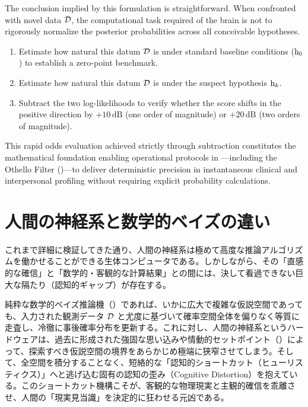     The conclusion implied by this formulation is straightforward.
    When confronted with novel data $\mathcal{D}$, the computational task required of the brain is not to rigorously normalize the posterior probabilities across all conceivable hypotheses.
    \begin{enumerate}
        \item Estimate how natural this datum $\mathcal{D}$ is under standard baseline conditions ($\mathrm{h}_0$) to establish a zero-point benchmark.
        \item Estimate how natural this datum $\mathcal{D}$ is under the suspect hypothesis $\mathrm{h}_k$.
        \item Subtract the two log-likelihoods to verify whether the score shifts in the positive direction by $+10\,\text{dB}$ (one order of magnitude) or $+20\,\text{dB}$ (two orders of magnitude).
    \end{enumerate}

    This rapid odds evaluation achieved strictly through subtraction constitutes the mathematical foundation enabling operational protocols in \fullSNLP—including the Othello Filter (\fullOthelloFilter)—to deliver deterministic precision in instantaneous clinical and interpersonal profiling without requiring explicit probability calculations.
\fi


\ifja
    \section{人間の神経系と数学的ベイズの違い}

    これまで詳細に検証してきた通り、人間の神経系は極めて高度な推論アルゴリズムを働かせることができる生体コンピュータである。しかしながら、その「直感的な確信」と「数学的・客観的な計算結果」との間には、決して看過できない巨大な隔たり（認知的ギャップ）が存在する。

    純粋な数学的ベイズ推論機（\fullMBIE）であれば、いかに広大で複雑な仮説空間であっても、入力された観測データ $\mathcal{D}$ と尤度に基づいて確率空間全体を偏りなく等質に走査し、冷徹に事後確率分布を更新する。これに対し、人間の神経系というハードウェアは、過去に形成された強固な思い込みや情動的セットポイント（\mthVirtualConviction）によって、探索すべき仮説空間の境界をあらかじめ極端に狭窄させてしまう。そして、全空間を積分することなく、短絡的な「認知的ショートカット（ヒューリスティクス）」へと逃げ込む固有の認知の歪み（Cognitive Distortion）を抱えている。このショートカット機構こそが、客観的な物理現実と主観的確信を乖離させ、人間の「現実見当識」を決定的に狂わせる元凶である。

